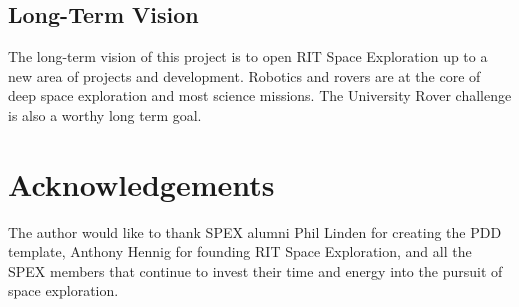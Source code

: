 \documentclass[conference]{IEEEtran} %
\begin{document}
\subsection{Long-Term Vision}
\label{sec:vision}
The long-term vision of this project is to open RIT Space Exploration up to a new area of projects and development. Robotics and rovers are at the core of deep space exploration and most science missions. The University Rover challenge is also a worthy long term goal. 

\section*{Acknowledgements}
The author would like to thank SPEX alumni Phil Linden for creating the PDD template, Anthony Hennig for founding RIT Space Exploration, and all the SPEX members that continue to invest their time and energy into the pursuit of space exploration.




\onecolumn
\appendices{}
\end{document}
